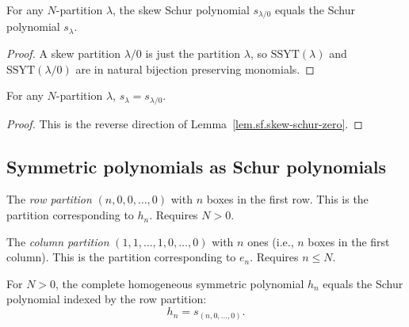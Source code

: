 \begin{lemma}
\label{lem.sf.skew-schur-zero}
\leanhelper
\leanok
For any $N$-partition $\lambda$, the skew Schur polynomial $s_{\lambda/0}$
equals the Schur polynomial $s_\lambda$.
\end{lemma}

\begin{proof}
\leanok
A skew partition $\lambda/0$ is just the partition $\lambda$,
so $\mathrm{SSYT}(\lambda)$ and $\mathrm{SSYT}(\lambda/0)$ are in
natural bijection preserving monomials.
\end{proof}

\begin{lemma}
\label{lem.sf.schur-eq-skewschur-zero}
\leanhelper
\leanok
For any $N$-partition $\lambda$,
$s_\lambda = s_{\lambda/0}$.
\end{lemma}

\begin{proof}
\leanok
This is the reverse direction of Lemma~\ref{lem.sf.skew-schur-zero}.
\end{proof}

\subsection{Symmetric polynomials as Schur polynomials}

\begin{definition}
\label{def.sf.row-partition}
\leanhelper
\leanok
The \emph{row partition} $(n, 0, 0, \ldots, 0)$ with $n$ boxes in
the first row. This is the partition corresponding to $h_n$.
Requires $N > 0$.
\end{definition}

\begin{definition}
\label{def.sf.col-partition}
\leanhelper
\leanok
The \emph{column partition} $(1, 1, \ldots, 1, 0, \ldots, 0)$ with $n$
ones (i.e., $n$ boxes in the first column). This is the partition
corresponding to $e_n$. Requires $n \leq N$.
\end{definition}

\begin{theorem}
\label{thm.sf.hsymm-eq-schur-row}
\leanhelper
\leanok
For $N > 0$, the complete homogeneous symmetric polynomial $h_n$ equals
the Schur polynomial indexed by the row partition:
\[
h_n = s_{(n, 0, \ldots, 0)}.
\]
\end{theorem}

